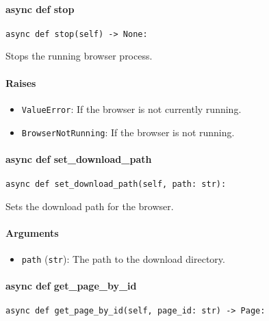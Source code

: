 \documentclass{article}
\begin{document}
\paragraph{async def stop}

\begin{lstlisting}[style=pythonstyle]
async def stop(self) -> None:
\end{lstlisting}

\noindent Stops the running browser process.

\paragraph{Raises}

\begin{itemize}
    \item \lstinline[style=pythonstyle]|ValueError|: If the browser is not currently running.
    \item \lstinline[style=pythonstyle]|BrowserNotRunning|: If the browser is not running.
\end{itemize}

\paragraph{async def set\_download\_path}

\begin{lstlisting}[style=pythonstyle]
async def set_download_path(self, path: str):
\end{lstlisting}

\noindent Sets the download path for the browser.

\paragraph{Arguments}

\begin{itemize}
    \item \lstinline[style=pythonstyle]|path| (\lstinline[style=pythonstyle]|str|): The path to the download directory.
\end{itemize}

\paragraph{async def get\_page\_by\_id}

\begin{lstlisting}[style=pythonstyle]
async def get_page_by_id(self, page_id: str) -> Page:
\end{lstlisting}
\end{document}
